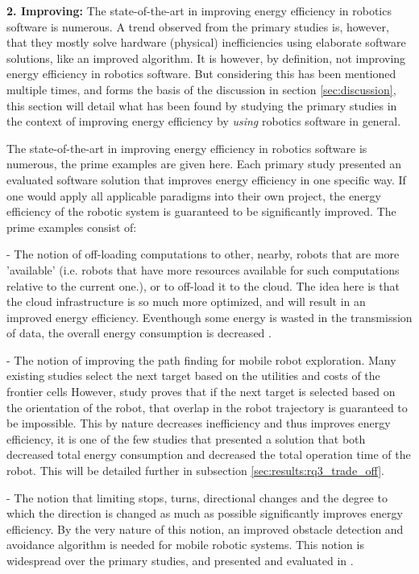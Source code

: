 \noindent\textbf{2. Improving:}
The state-of-the-art in improving energy efficiency in robotics software is numerous. 
A trend observed from the primary studies is, however, that they mostly solve hardware (physical) inefficiencies using elaborate
software solutions, like an improved algorithm.
It is however, by definition, not improving energy efficiency in robotics software.
But considering this has been mentioned multiple times, and forms the basis of the discussion in section \ref{sec:discussion}, 
this section will detail what has been found by studying the primary studies in the context of improving energy efficiency 
by \textit{using} robotics software in general.

The state-of-the-art in improving energy efficiency in robotics software is numerous, the prime examples are given here.
Each primary study presented an evaluated software solution that improves energy efficiency in one specific way.
If one would apply all applicable paradigms into their own project, 
the energy efficiency of the robotic system is guaranteed to be significantly improved.
The prime examples consist of:

- The notion of off-loading computations to other, nearby, robots that are more 'available' 
(i.e. robots that have more resources available for such computations relative to the current one.), or to off-load it to the cloud.
The idea here is that the cloud infrastructure is so much more optimized, and will result in an improved energy efficiency.
Eventhough some energy is wasted in the transmission of data, the overall energy consumption is decreased \cite{rahman2019cloud_robot_offloading}.
    
- The notion of improving the path finding for mobile robot exploration. 
Many existing studies select the next target based on the utilities and costs of the frontier cells 
\cite{burgard2005multi_robot_exploration, simmons2000multi_robot_exploration,zlot2002multi_robot_exploration} 
However, study \cite{mei2006mobile_exploration} proves that if the next target is selected based on the orientation of the robot, 
that overlap in the robot trajectory is guaranteed to be impossible. This by nature decreases inefficiency and thus improves energy 
efficiency, it is one of the few studies that presented a solution that both decreased total energy consumption and decreased the 
total operation time of the robot. This will be detailed further in subsection \ref{sec:results:rq3_trade_off}.

- The notion that limiting stops, turns, directional changes and the degree to which the direction is changed as much as possible 
significantly improves energy efficiency. By the very nature of this notion, an improved obstacle detection and avoidance algorithm
is needed for mobile robotic systems. This notion is widespread over the primary studies, and presented and evaluated in 
\cite{xie2018mecanum_wheel, kim2016firefighting_robot, benkrid2016multi_robot_exploration, barili1995efficient_motion, 
jia2004grid_strategy_exploration, mei2005energy_consumers_identified, patel2012exploration_strategy}.

